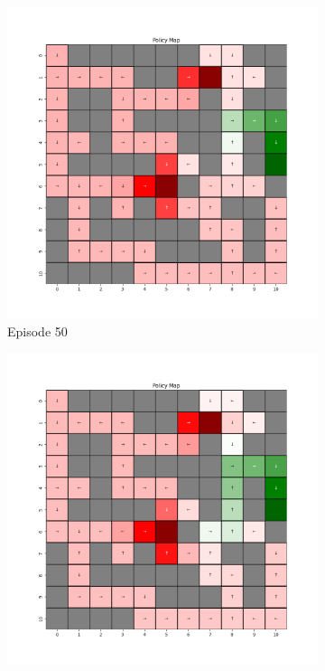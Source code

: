 \documentclass{assignment}
\begin{document}
\begin{figure}[H]
\begin{subfigure}{0.3\textwidth}
        \includegraphics[width=\textwidth]{figures/policy_td/alpha_sweep/policy_alpha_0.1_gamma_0.95_epsilon_0.2_iteration_50.png}
    \caption{Episode 50}
    \end{subfigure}\hfill
    \begin{subfigure}{0.3\textwidth}
        \includegraphics[width=\textwidth]{figures/policy_td/alpha_sweep/policy_alpha_0.1_gamma_0.95_epsilon_0.2_iteration_100.png}

\end{subfigure}
\end{figure}
\end{document}
